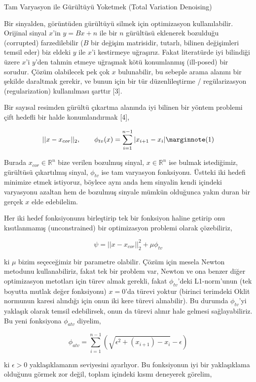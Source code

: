 \documentclass[12pt,fleqn]{article}\usepackage{../../common}
\begin{document}
Tam Varyasyon ile Gürültüyü Yoketmek (Total Variation Denoising)

Bir sinyalden, görüntüden gürültüyü silmek için optimizasyon
kullanılabilir. Orijinal sinyal $x$'in $y = B x + n$ ile bir $n$ gürültüsü
eklenerek bozulduğu (corrupted) farzedilebilir ($B$ bir değişim matrisidir,
tutarlı, bilinen değişimleri temsil eder) biz eldeki $y$ ile $x$'i
kestirmeye uğraşırız.  Fakat literatürde iyi bilindiği üzere $x$'i $y$'den
tahmin etmeye uğraşmak kötü konumlanmış (ill-posed) bir sorudur. Çözüm
olabilecek pek çok $x$ bulunabilir, bu sebeple arama alanını bir şekilde
daraltmak gerekir, ve bunun için bir tür düzenlileştirme / regülarizasyon
(regularization) kullanılması şarttır [3].

Bir sayısal resimden gürültü çıkartma alanında iyi bilinen bir yöntem
problemi çift hedefli bir halde konumlandırmak [4],

$$
|| x-x_{cor}||_2, \qquad \phi_{tv} (x) = \sum_{i=1}^{n-1} | x_{i+1} - x_i | 
\mlabel{1}
$$

Burada $x_{cor} \in \mathbb{R}^n$ bize verilen bozulmuş sinyal,
$x \in \mathbb{R}^n$ ise bulmak istediğimiz, gürültüsü çıkartılmış sinyal,
$\phi_{tv}$ ise tam varyasyon fonksiyonu. Üstteki iki hedefi minimize etmek
istiyoruz, böylece aynı anda hem sinyalin kendi içindeki varyasyonu azaltan
hem de bozulmuş sinyale mümkün olduğunca yakın duran bir gerçek $x$ elde
edebilelim.

Her iki hedef fonksiyonunu birleştirip tek bir fonksiyon haline getirip onu
kısıtlanmamış (unconstrained) bir optimizasyon problemi olarak çözebiliriz,

$$
\psi = || x-x_{cor}||_2^2 + \mu \phi_{tv} 
$$

ki $\mu$ bizim seçeceğimiz bir parametre olabilir. Çözüm için mesela Newton
metodunu kullanabiliriz, fakat tek bir problem var, Newton ve ona benzer
diğer optimizasyon metotları için türev almak gerekli, fakat
$\phi_{tv}$'deki L1-norm'unun (tek boyutta mutlak değer fonksiyonu)
$x=0$'da türevi yoktur (birinci terimdeki Oklit normunun karesi alındığı
için onun iki kere türevi alınabilir). Bu durumda $\phi_{tv}$'yi yaklaşık
olarak temsil edebilirsek, onun da türevi alınır hale gelmesi
sağlayabiliriz. Bu yeni fonksiyona $\phi_{atv}$ diyelim,

$$
\phi_{atv} = \sum _{i=1}^{n-1} 
\left( \sqrt{ \epsilon^2 + (x_{i+1})-x_i  } - \epsilon \right)
$$

ki $\epsilon > 0$ yaklaşıklamanın seviyesini ayarlıyor. Bu fonksiyonun iyi
bir yaklaşıklama olduğunu görmek zor değil, toplam içindeki kısmı deneyerek
görelim,
\end{document}
